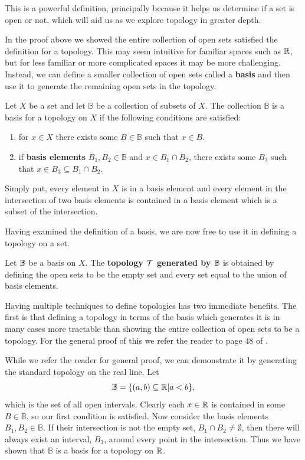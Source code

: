 This is a powerful definition, principally because it helps us determine if a set is open or not, which will aid us as we explore topology in greater depth.

In the proof above we showed the entire collection of open sets satisfied the definition for a topology. This may seem intuitive for familiar spaces such as $\mathbb{R}$, but for less familiar or more complicated spaces it may be more challenging. Instead, we can define a smaller collection of open sets called a \textbf{basis} and then use it to generate the remaining open sets in the topology.

\begin{defn}
Let $X$ be a set and let $\mathbb{B}$ be a collection of subsets of $X$. The collection $\mathbb{B}$ is a basis for a topology on $X$ if the following conditions are satisfied:
\begin{enumerate}
\item for $x\in X$ there exists some $B\in \mathbb{B}$ such that $x\in B$.
\item if \textbf{basis elements} $B_1, B_2 \in \mathbb{B}$ and $x\in B_1 \cap B_2$, there exists some $B_3$ such that $x \in B_3 \subseteq B_1 \cap B_2$.\cite{top}
\end{enumerate}
\end{defn}

Simply put, every element in $X$ is in a basis element and every element in the intersection of two basis elements is contained in a basis element which is a subset of the intersection.

Having examined the definition of a basis, we are now free to use it in defining a topology on a set.

\begin{defn}
Let $\mathbb{B}$ be a basis on $X$. The \textbf{topology $\mathcal{T}$ generated by $\mathbb{B}$} is obtained by defining the open sets to be the empty set and every set equal to the union of basis elements.
\end{defn}

Having multiple techniques to define topologies has two immediate benefits. The first is that defining a topology in terms of the basis which generates it is in many cases more tractable than showing the entire collection of open sets to be a topology. For the general proof of this we refer the reader to page $48$ of \cite{top}.

While we refer the reader for general proof, we can demonstrate it by generating the standard topology on the real line. Let $$\mathbb{B}=\{ (a,b)\subseteq \mathbb{R}| a<b\},$$ which is the set of all open intervals. Clearly each $x\in \mathbb{R}$ is contained in some $B\in \mathbb{B}$, so our first condition is satisfied. Now consider the basis elements $B_1, B_2\in \mathbb{B}$. If their intersection is not the empty set, $B_1\cap B_2 \neq \emptyset$, then there will always exist an interval, $B_3$, around every point in the intersection. Thus we have shown that $\mathbb{B}$ is a basis for a topology on $\mathbb{R}$. 


